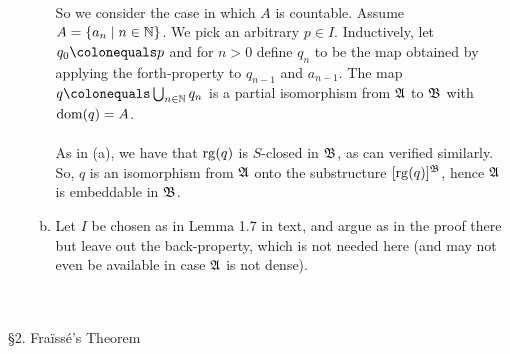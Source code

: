 \begin{enumerate}[1.]
\begin{enumerate}[(a)]
\ \\
So we consider the case in which $A$ is countable. Assume $A = \{ a_n \mid n \in \mathbb{N} \}$. We pick an arbitrary $p \in I$. Inductively, let $q_0 \colonequals p$ and for $n > 0$ define $q_n$ to be the map obtained by applying the forth-property to $q_{n - 1}$ and $a_{n - 1}$. The map $q \colonequals \bigcup_{n \in \nat} q_n$ is a partial isomorphism from $\mathfrak{A}$ to $\mathfrak{B}$ with ${\mathrm{dom}(q)} = A$.\\
\ \\
As in (a), we have that ${\mathrm{rg}(q)}$ is $S$-closed in $\mathfrak{B}$, as can verified similarly. So, $q$ is an isomorphism from $\mathfrak{A}$ onto the substructure $[{\mathrm{rg}(q)}]^{\mathfrak{B}}$, hence $\mathfrak{A}$ is embeddable in $\mathfrak{B}$.
\item Let $I$ be chosen as in Lemma 1.7 in text, and argue as in the proof there but leave out the back-property, which is not needed here (and may not even be available in case $\mathfrak{A}$ is not dense).
\end{enumerate}
\end{enumerate}
\
\\
\\
{\large \S2. Fra\"{i}ss\'{e}'s Theorem}
